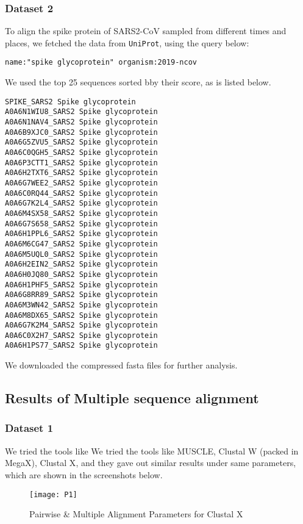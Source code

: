 \documentclass[en,black,12pt,normal]{elegantnote}
\newcommand{\upcite}[1]{\textsuperscript{\textsuperscript{\cite{#1}}}}
\begin{document}
\subsubsection{Dataset 2}
To align the spike protein of SARS2-CoV sampled from different times and places, 
we fetched the data from \texttt{UniProt}, using the query below:

\lstinline{name:"spike glycoprotein" organism:2019-ncov}

We used the top 25 sequences sorted bby their score, as is listed below.

\begin{lstlisting}
SPIKE_SARS2 Spike glycoprotein
A0A6N1WIU8_SARS2 Spike glycoprotein
A0A6N1NAV4_SARS2 Spike glycoprotein
A0A6B9XJC0_SARS2 Spike glycoprotein
A0A6G5ZVU5_SARS2 Spike glycoprotein
A0A6C0QGH5_SARS2 Spike glycoprotein
A0A6P3CTT1_SARS2 Spike glycoprotein
A0A6H2TXT6_SARS2 Spike glycoprotein
A0A6G7WEE2_SARS2 Spike glycoprotein
A0A6C0RQ44_SARS2 Spike glycoprotein
A0A6G7K2L4_SARS2 Spike glycoprotein
A0A6M4SX58_SARS2 Spike glycoprotein
A0A6G7S658_SARS2 Spike glycoprotein
A0A6H1PPL6_SARS2 Spike glycoprotein
A0A6M6CG47_SARS2 Spike glycoprotein
A0A6M5UQL0_SARS2 Spike glycoprotein
A0A6H2EIN2_SARS2 Spike glycoprotein
A0A6H0JQ80_SARS2 Spike glycoprotein
A0A6H1PHF5_SARS2 Spike glycoprotein
A0A6G8RR89_SARS2 Spike glycoprotein
A0A6M3WN42_SARS2 Spike glycoprotein
A0A6M8DX65_SARS2 Spike glycoprotein
A0A6G7K2M4_SARS2 Spike glycoprotein
A0A6C0X2H7_SARS2 Spike glycoprotein
A0A6H1PS77_SARS2 Spike glycoprotein
\end{lstlisting}

We downloaded the compressed fasta files for further analysis.

\subsection{Results of Multiple sequence alignment}

\subsubsection{Dataset 1}

We tried the tools like We tried the tools like MUSCLE\upcite{edgar2004muscle}, Clustal W\upcite{larkin2007clustal} (packed in MegaX\upcite{kumar2018mega}), Clustal X\upcite{larkin2007clustal}, and they gave out similar results under same parameters, which are shown in the screenshots below. 

\begin{figure}[H]
    \centering
    \texttt{[image: P1]}
    \caption{Pairwise \& Multiple Alignment Parameters for Clustal X}
    \label{P-01}
\end{figure}
\end{document}
